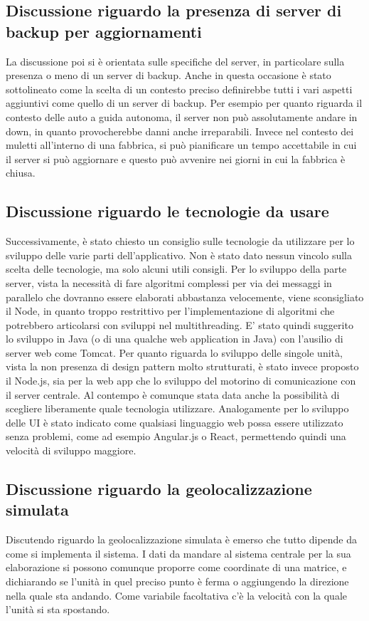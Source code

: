 \subsection{Discussione riguardo la presenza di server di backup per aggiornamenti}
La discussione poi si è orientata sulle specifiche del server, in particolare sulla presenza o meno di un server di backup. Anche in questa occasione è stato sottolineato come la scelta di un contesto preciso definirebbe tutti i vari aspetti aggiuntivi come quello di un server di backup. 
Per esempio per quanto riguarda il contesto delle auto a guida autonoma, il server non può assolutamente andare in down, in quanto provocherebbe danni anche irreparabili. Invece nel contesto dei muletti all'interno di una fabbrica, si può pianificare un tempo accettabile in cui il server si può aggiornare e questo può avvenire nei giorni in cui la fabbrica è chiusa. 

\subsection{Discussione riguardo le tecnologie da usare}
Successivamente, è stato chiesto un consiglio sulle tecnologie da utilizzare per lo sviluppo delle varie parti dell'applicativo. Non è stato dato nessun vincolo sulla scelta delle tecnologie, ma solo alcuni utili consigli.
Per lo sviluppo della parte server, vista la necessità di fare algoritmi complessi per via dei messaggi in parallelo che dovranno essere elaborati abbastanza velocemente, viene sconsigliato il Node, in quanto troppo restrittivo per l'implementazione di algoritmi che potrebbero articolarsi con sviluppi nel multithreading.
E' stato quindi suggerito lo sviluppo in Java (o di una qualche web application in Java) con l'ausilio di server web come Tomcat. 
Per quanto riguarda lo sviluppo delle singole unità, vista la non presenza di design pattern molto strutturati, è stato invece proposto il Node.js, sia per la web app che lo sviluppo del motorino di comunicazione con il server centrale. Al contempo è comunque stata data anche la possibilità di scegliere liberamente quale tecnologia utilizzare. Analogamente per lo sviluppo delle UI è stato indicato come qualsiasi linguaggio web possa essere utilizzato senza problemi, come ad esempio Angular.js o React, permettendo quindi una velocità di sviluppo maggiore.

\subsection{Discussione riguardo la geolocalizzazione simulata}
Discutendo riguardo la geolocalizzazione simulata è emerso che tutto dipende da come si implementa il sistema. I dati da mandare al sistema centrale per la sua elaborazione si possono comunque proporre come coordinate di una matrice, e dichiarando se l'unità in quel preciso punto è ferma o aggiungendo la direzione nella quale sta andando. Come variabile facoltativa c'è la velocità con la quale l'unità si sta spostando. 

